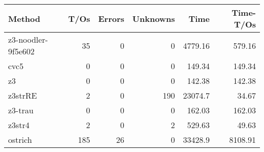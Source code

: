 \begin{tabular}{lrrrrr}
\hline
 Method             &   T/Os &   Errors &   Unknowns &     Time &   Time-T/Os \\
\hline
 z3-noodler-9f5e602 &     35 &        0 &          0 &  4779.16 &      579.16 \\
 cvc5               &      0 &        0 &          0 &   149.34 &      149.34 \\
 z3                 &      0 &        0 &          0 &   142.38 &      142.38 \\
 z3strRE            &      2 &        0 &        190 & 23074.7  &       34.67 \\
 z3-trau            &      0 &        0 &          0 &   162.03 &      162.03 \\
 z3str4             &      2 &        0 &          2 &   529.63 &       49.63 \\
 ostrich            &    185 &       26 &          0 & 33428.9  &     8108.91 \\
\hline
\end{tabular}
